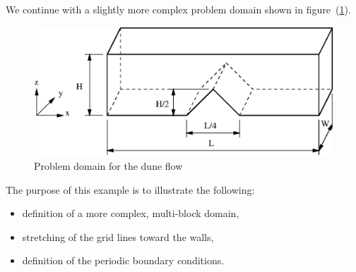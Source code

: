 \documentclass[10pt]{article}
\begin{document}
    We continue with a slightly more complex problem domain
    shown in figure~(\ref{dune}). 
    \begin{figure}
    \centering
    \includegraphics[scale=0.8]{dune.eps}
    \caption{Problem domain for the dune flow}
    \label{dune}
    \end{figure}
    The purpose of this example
    is to illustrate the following:
    \begin{itemize}
    \item definition of a more complex, multi-block domain, 
    \item stretching of the grid lines toward the walls,  
    \item definition of the periodic boundary conditions.
    \end{itemize}
     
\end{document}
